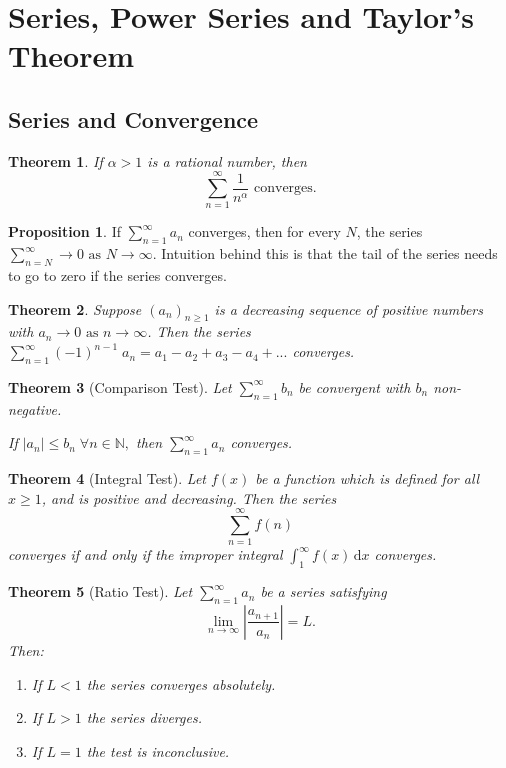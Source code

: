 \documentclass[11pt,a4paper]{article}
\newcommand\N{\mathbb{N}}
\newcommand\dee{\text{d}}
\newtheorem{theorem}{Theorem}
\theoremstyle{definition}
\newtheorem{proposition}{Proposition}
\begin{document}
\pagebreak

\section{Series, Power Series and Taylor's Theorem}
\subsection{Series and Convergence}

\begin{theorem}
    If $ \alpha > 1 $ is a rational number, then
    \[ \sum_{n = 1}^\infty \frac{1}{n^\alpha} \text{ converges.}\]
\end{theorem}

\begin{proposition}
    If $ \sum_{n = 1}^\infty a_n $ converges, then for every $ N $, the series $ \sum_{n = N}^\infty \to 0 \text{ as } N \to \infty$.
    Intuition behind this is that the tail of the series needs to go to zero if the series converges. 
\end{proposition}

\begin{theorem}
    Suppose $ (a_n)_{n \geq 1} $ is a decreasing sequence of positive numbers with $ a_n \to 0 \text{ as } n \to \infty$. 
    Then the series  $ \sum_{n = 1}^\infty (-1)^{n - 1} \; a_n = a_1 - a_2 + a_3 - a_4 + ... $ converges.
\end{theorem}

\begin{theorem}[Comparison Test]
   Let $ \sum_{n = 1}^\infty b_n $ be convergent with $ b_n $ non-negative. 
   
   If $ |a_n| \leq b_n \; \forall n \in \N, $ then $ \sum_{n = 1}^\infty a_n $ converges.  
\end{theorem}

\begin{theorem}[Integral Test]
   Let $ f(x) $ be a function which is defined for all $ x \geq 1 $, and is positive and decreasing. 
   Then the series
   \[ \sum_{n = 1}^\infty f(n)\]
   converges if and only if the improper integral $ \int_{1}^\infty f(x) \, \dee x $ converges.
\end{theorem}

\begin{theorem}[Ratio Test]
   Let $ \sum_{n = 1}^\infty a_n $ be a series satisfying
   \[ \lim_{n \to \infty} \left|\frac{a_{n + 1}}{a_n}\right| = L.\] 
   Then:
   \begin{enumerate}
       \item If $ L < 1 $ the series converges absolutely.
       \item If $ L > 1 $ the series diverges.
       \item If $ L = 1 $ the test is inconclusive.
   \end{enumerate}
\end{theorem}
\end{document}
